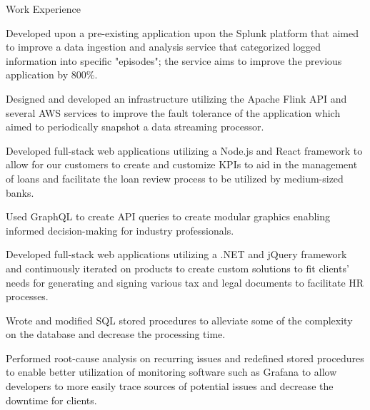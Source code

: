 \documentclass{resume} %
\begin{document}
\begin{workSection}{Work Experience}
    \experienceItem[
        company=Splunk,
        location=San Jose{,} CA,
        position=Backend Software Engineer Intern,
        duration=May 2023 – July 2023
    ]
     \begin{bullets}
        \item Developed upon a pre-existing application upon the Splunk platform that aimed to improve a data ingestion and analysis service that categorized logged information into specific "episodes"; the service aims to improve the previous application by 800\%.
        \item Designed and developed an infrastructure utilizing the Apache Flink API and several AWS services to improve the fault tolerance of the application which aimed to periodically snapshot a data streaming processor.
     \end{bullets}
     
    \experienceItem[
        company=QwickRate,
        location=Marietta{,} GA (Remote),
        position=Software Engineer Intern,
        duration=August 2022 – April 2023
    ]
    \begin{bullets}
        \item Developed full-stack web applications utilizing a Node.js and React framework to allow for our customers to create and customize KPIs to aid in the management of loans and facilitate the loan review process to be utilized by medium-sized banks.
        \item Used GraphQL to create API queries to create modular graphics enabling informed decision-making for industry professionals.
     \end{bullets}

     \experienceItem[
        company=Ultimate Kronos Group (UKG),
        location=Atlanta{,} GA,
        position=Full-stack Software Engineer Intern,
        duration=January 2022 - August 2022,
     ]
     \begin{bullets}
        \item Developed full-stack web applications utilizing a .NET and jQuery framework and continuously iterated on products to create custom solutions to fit clients’ needs for generating and signing various tax and legal documents to facilitate HR processes.
        \item Wrote and modified SQL stored procedures to alleviate some of the complexity on the database and decrease the processing time.
        \item Performed root-cause analysis on recurring issues and redefined stored procedures to enable better utilization of monitoring software such as Grafana to allow developers to more easily trace sources of potential issues and decrease the downtime for clients.
     \end{bullets}
     
\end{workSection}
\end{document}
